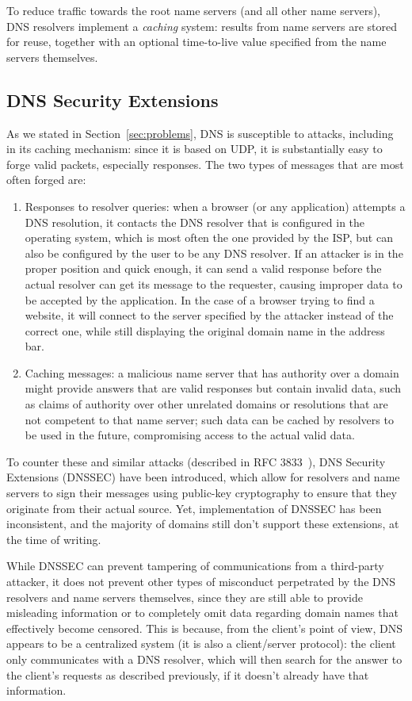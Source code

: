 \documentclass[mscthesis]{usiinfthesis}
\begin{document}
To reduce traffic towards the root name servers (and all other name servers), DNS resolvers implement a \emph{caching} system: results from name servers are stored for reuse, together with an optional time-to-live value specified from the name servers themselves.

\subsection{DNS Security Extensions}

As we stated in Section~\ref{sec:problems}, DNS is susceptible to attacks, including in its caching mechanism: since it is based on UDP, it is substantially easy to forge valid packets, especially responses. The two types of messages that are most often forged are:
\begin{enumerate}
	\item Responses to resolver queries: when a browser (or any application) attempts a DNS resolution, it contacts the DNS resolver that is configured in the operating system, which is most often the one provided by the ISP, but can also be configured by the user to be any DNS resolver. If an attacker is in the proper position and quick enough, it can send a valid response before the actual resolver can get its message to the requester, causing improper data to be accepted by the application. In the case of a browser trying to find a website, it will connect to the server specified by the attacker instead of the correct one, while still displaying the original domain name in the address bar.
	\item Caching messages: a malicious name server that has authority over a domain might provide answers that are valid responses but contain invalid data, such as claims of authority over other unrelated domains or resolutions that are not competent to that name server; such data can be cached by resolvers to be used in the future, compromising access to the actual valid data.
\end{enumerate}

To counter these and similar attacks (described in RFC 3833~\cite{rfc:3833}), DNS Security Extensions (DNSSEC) have been introduced, which allow for resolvers and name servers to sign their messages using public-key cryptography to ensure that they originate from their actual source. Yet, implementation of DNSSEC has been inconsistent, and the majority of domains still don't support these extensions, at the time of writing.

While DNSSEC can prevent tampering of communications from a third-party attacker, it does not prevent other types of misconduct perpetrated by the DNS resolvers and name servers themselves, since they are still able to provide misleading information or to completely omit data regarding domain names that effectively become censored. This is because, from the client's point of view, DNS appears to be a centralized system (it is also a client/server protocol): the client only communicates with a DNS resolver, which will then search for the answer to the client's requests as described previously, if it doesn't already have that information.
\end{document}
